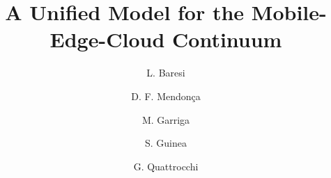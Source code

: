 \documentclass[format=acmsmall, review=true, screen=false]{acmart}
\begin{document}
	\title[A Unified Model for the Mobile-Edge-Cloud Continuum]{A Unified Model for the Mobile-Edge-Cloud Continuum}  
	
	\author{L. Baresi}
	\author{D. F. Mendon\c{c}a}
	\author{M. Garriga}
	\author{S. Guinea}
	\author{G. Quattrocchi}
	
	
	\begin{abstract}
		
	\end{abstract}
	
\end{document}
